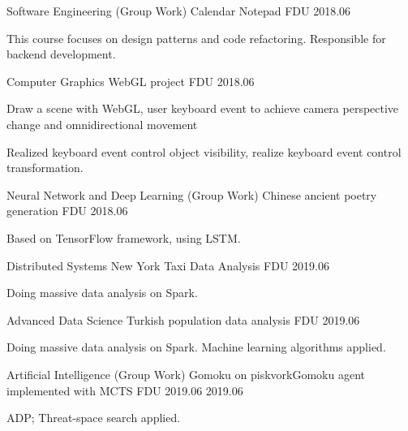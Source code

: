 \begin{cventries}
  \cventry
    {Software Engineering (Group Work)}
    {Calendar Notepad}
    {FDU}
    {2018.06}
    {
      \begin{cvitems} %
        \item {This course focuses on design patterns and code refactoring. Responsible for backend development.}
      \end{cvitems}
    }

  \cventry
    {Computer Graphics}
    {WebGL project}
    {FDU}
    {2018.06}
    {
      \begin{cvitems} %
        \item {Draw a scene with WebGL, user keyboard event to achieve camera perspective change and omnidirectional movement}
        \item {Realized keyboard event control object visibility, realize keyboard event control transformation.}
      \end{cvitems}
    }

  \cventry
    {Neural Network and Deep Learning (Group Work)}
    {Chinese ancient poetry generation}
    {FDU}
    {2018.06}
    {
      \begin{cvitems} %
        \item {Based on TensorFlow framework, using LSTM.}
      \end{cvitems}
    }

  \cventry
    {Distributed Systems}
    {New York Taxi Data Analysis}
    {FDU}
    {2019.06}
    {
      \begin{cvitems} %
        \item {Doing massive data analysis on Spark.}
      \end{cvitems}
    }

  \cventry
    {Advanced Data Science}
    {Turkish population data analysis}
    {FDU}
    {2019.06}
    {
      \begin{cvitems} %
        \item {Doing massive data analysis on Spark. Machine learning algorithms applied.}
      \end{cvitems}
    }

  \cventry
    {Artificial Intelligence (Group Work)}
    {Gomoku on piskvorkGomoku agent implemented with MCTS}
    {FDU}
    {2019.06
    2019.06}
    {
      \begin{cvitems} %
      \item {ADP; Threat-space search applied.}
      \end{cvitems}
    }


\end{cventries}
